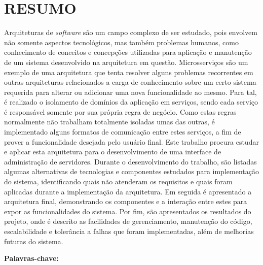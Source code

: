 \chapter*{RESUMO}

\noindent Arquiteturas de \emph{software} são um campo complexo de ser estudado,
pois envolvem não somente aspectos tecnológicos, mas também problemas
humanos, como conhecimento de conceitos e concepções utilizadas para
aplicação e manutenção de um sistema desenvolvido na arquitetura em questão.
Microsserviços são um exemplo de uma arquitetura que tenta resolver alguns
problemas recorrentes em outras arquiteturas relacionados a carga de
conhecimento sobre um certo sistema requerida para alterar ou adicionar uma
nova funcionalidade ao mesmo. Para tal, é realizado o isolamento de domínios da
aplicação em serviços, sendo cada serviço é responsável somente por sua própria
regra de negócio. Como estas regras normalmente não trabalham totalmente
isoladas umas das outras, é implementado alguns formatos de comunicação entre
estes serviços, a fim de prover a funcionalidade desejada pelo usuário final.
Este trabalho procura estudar e aplicar esta arquitetura para o
desenvolvimento de uma interface de administração de servidores. Durante o
desenvolvimento do trabalho, são listadas algumas alternativas de
tecnologias e componentes estudados para implementação do sistema,
identificando quais não atenderam os requisitos e quais foram aplicadas
durante a implementação da arquitetura. Em seguida é apresentado a
arquitetura final, demonstrando os componentes e a interação entre estes
para expor as funcionalidades do sistema. Por fim, são apresentados os
resultados do projeto, onde é descrito as facilidades de gerenciamento,
manutenção do código, escalabilidade e tolerância a falhas que foram
implementadas, além de melhorias futuras do sistema.

\newline\newline\noindent \textbf{Palavras-chave:} \ptBRKeyword
